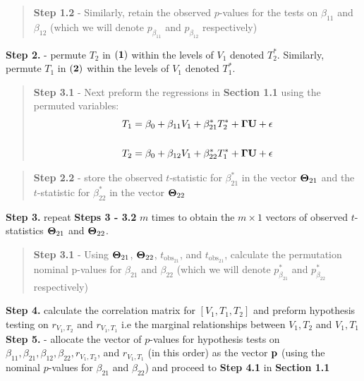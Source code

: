 \documentclass[12pt]{report}
\begin{document}
\begin{quote}
\textbf{Step 1.2} - Similarly, retain the observed $p$-values for the tests on $\beta_{11}$ and $\beta_{12}$ (which we will denote $p_{\beta_{11}}$ and $p_{\beta_{12}}$ respectively)
\end{quote}

\noindent \textbf{Step 2.} - permute $T_2$ in $\bf (1)$ within the levels of $V_1$ denoted $T_2^{\ast}$. Similarly, permute $T_1$ in $\bf (2)$ within the levels of $V_1$ denoted $T_1^{\ast}$. 
\begin{quote}
\textbf{Step 3.1} - Next preform the regressions in \textbf{Section 1.1} using the permuted variables:
\begin{eqnarray}
T_1 = \beta_0 +\beta_{11}V_1+\beta_{21}^{\ast}T_2^{\ast}+{\bf \Gamma U}+ \epsilon \\
\nonumber\\
T_2 = \beta_0 +\beta_{12}V_1+\beta_{22}^{\ast}T_1^{\ast}+{\bf \Gamma U}+ \epsilon 
\end{eqnarray}
\end{quote}

\begin{quote}
\textbf{Step 2.2} - store the observed $t$-statistic for $\beta_{21}^{\ast}$ in the vector ${\bf \Theta}_{21}$ and the $t$-statistic for $\beta_{22}^{\ast}$ in the vector ${\bf \Theta}_{22}$
\end{quote}

\noindent \textbf{Step 3.} repeat \textbf{Steps 3 - 3.2} $m$ times to obtain the $m \times 1$ vectors of observed $t$-statistics ${\bf \Theta}_{21}$ and ${\bf \Theta}_{22}$. \\

\begin{quote}
\textbf{Step 3.1} - Using ${\bf \Theta}_{21}$, ${\bf \Theta}_{22}$, $t_{\text{obs}_{21}}$, and $t_{\text{obs}_{21}}$, calculate the permutation nominal p-values for $\beta_{21}$ and $\beta_{22}$ (which we will denote $p_{\beta_{21}}^{\ast}$ and $p_{\beta_{22}}^{\ast}$ respectively)
\end{quote}

\noindent \textbf{Step 4.} calculate the correlation matrix for $[V_1, T_1, T_2]$ and preform hypothesis testing on $r_{V_1,T_2}$ and $r_{V_1, T_1}$ i.e the marginal relationships between $V_1,T_2$ and $V_1, T_1$ \\

\noindent \textbf{Step 5.} - allocate the vector of $p$-values for hypothesis tests on $\beta_{11}, \beta_{21}, \beta_{12}, \beta_{22}, r_{V_1,T_2}$, and $r_{V_1, T_1}$ (in this order) as the vector $\bf {p}$ (using the nominal $p$-values for $\beta_{21}$ and $\beta_{22}$) and proceed to \textbf{Step 4.1} in \textbf{Section 1.1} \\
\end{document}
